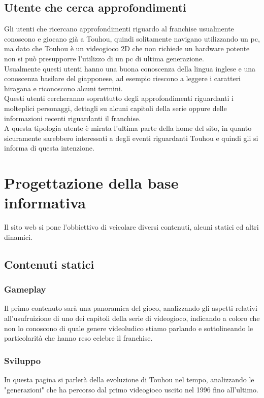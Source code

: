 \documentclass[openany, a4paper, 12pt]{report}
\begin{document}
		\subsection{Utente che cerca approfondimenti}
		Gli utenti che ricercano approfondimenti riguardo al franchise usualmente conoscono e giocano già a Touhou, quindi solitamente navigano utilizzando un pc, ma dato che Touhou è un videogioco 2D che non richiede un hardware potente non si può presupporre l'utilizzo di un pc di ultima generazione.\\
		Usualmente questi utenti hanno una buona conoscenza della lingua inglese e una conoscenza basilare del giapponese, ad esempio riescono a leggere i caratteri hiragana e riconoscono alcuni termini.\\
		Questi utenti cercheranno soprattutto degli approfondimenti riguardanti i molteplici personaggi, dettagli su alcuni capitoli della serie oppure delle informazioni recenti riguardanti il franchise.\\
		A questa tipologia utente è mirata l'ultima parte della home del sito, in quanto sicuramente sarebbero interessati a degli eventi riguardanti Touhou e quindi gli si informa di questa intenzione.
	
	\section{Progettazione della base informativa}
		Il sito web si pone l'obbiettivo di veicolare diversi contenuti, alcuni statici ed altri dinamici.
	\subsection{Contenuti statici}
		\subsubsection{Gameplay}
		Il primo contenuto sarà una panoramica del gioco, analizzando gli aspetti relativi all'usufruizione di uno dei capitoli della serie di videogioco, indicando a coloro che non lo conoscono di quale genere videoludico stiamo parlando e sottolineando le particolarità che hanno reso celebre il franchise.
		\subsubsection{Sviluppo}
		In questa pagina si parlerà della evoluzione di Touhou nel tempo, analizzando le "generazioni" che ha percorso dal primo videogioco uscito nel 1996 fino all'ultimo.
\end{document}
